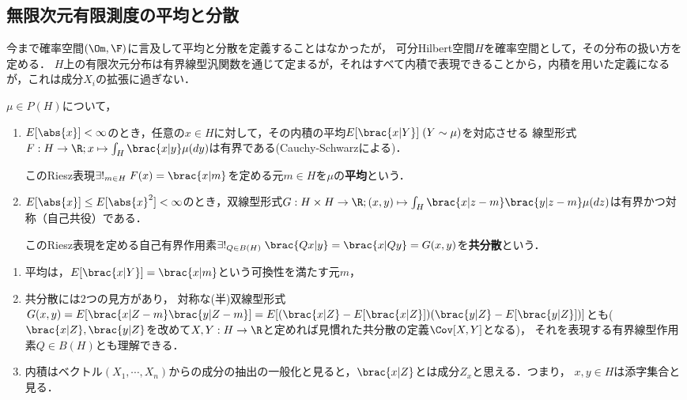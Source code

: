\documentclass[uplatex,dvipdfmx]{jsreport}
\begin{document}
\subsection{無限次元有限測度の平均と分散}

\begin{tcolorbox}[colframe=ForestGreen, colback=ForestGreen!10!white,breakable,colbacktitle=ForestGreen!40!white,coltitle=black,fonttitle=\bfseries\sffamily,
title=]
    今まで確率空間$(\Om,\F)$に言及して平均と分散を定義することはなかったが，
    可分Hilbert空間$H$を確率空間として，その分布の扱い方を定める．
    $H$上の有限次元分布は有界線型汎関数を通じて定まるが，それはすべて内積で表現できることから，内積を用いた定義になるが，これは成分$X_i$の拡張に過ぎない．
\end{tcolorbox}

\begin{definition}
    $\mu\in P(H)$について，
    \begin{enumerate}
        \item $E[\abs{x}]<\infty$のとき，任意の$x\in H$に対して，その内積の平均$E[\brac{x|Y}]\;(Y\sim\mu)$を対応させる
        線型形式$F:H\to\R;x\mapsto\int_H\brac{x|y}\mu(dy)$は有界である(Cauchy-Schwarzによる)．
        
        このRiesz表現$\exists!_{m\in H}\;F(x)=\brac{x|m}$を定める元$m\in H$を$\mu$の\textbf{平均}という．
        \item $E[\abs{x}]\le E[\abs{x}^2]<\infty$のとき，双線型形式$G:H\times H\to\R;(x,y)\mapsto\int_H\brac{x|z-m}\brac{y|z-m}\mu(dz)$は有界かつ対称（自己共役）である．
        
        このRiesz表現を定める自己有界作用素$\exists!_{Q\in B(H)}\;\brac{Qx|y}=\brac{x|Qy}=G(x,y)$を\textbf{共分散}という．
    \end{enumerate}
\end{definition}
\begin{remarks}\mbox{}
    \begin{enumerate}
        \item 平均は，$E[\brac{x|Y}]=\brac{x|m}$という可換性を満たす元$m$，
        \item 共分散には2つの見方があり，
        対称な(半)双線型形式$G(x,y)=E[\brac{x|Z-m}\brac{y|Z-m}]=E[(\brac{x|Z}-E[\brac{x|Z}])(\brac{y|Z}-E[\brac{y|Z}])]$とも($\brac{x|Z},\brac{y|Z}$を改めて$X,Y:H\to\R$と定めれば見慣れた共分散の定義$\Cov[X,Y]$となる)，
        それを表現する有界線型作用素$Q\in B(H)$とも理解できる．
        \item 内積はベクトル$(X_1,\cdots,X_n)$からの成分の抽出の一般化と見ると，$\brac{x|Z}$とは成分$Z_x$と思える．つまり，
        $x,y\in H$は添字集合と見る．
    \end{enumerate}
\end{remarks}
\end{document}
